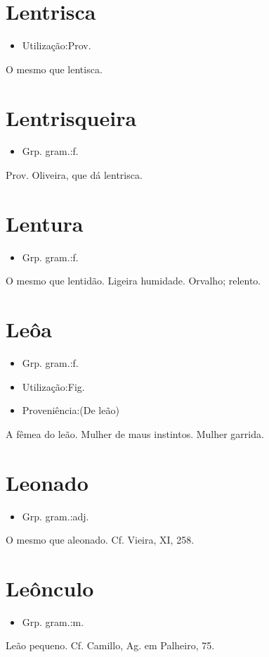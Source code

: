 \section{Lentrisca}
\begin{itemize}
\item {Utilização:Prov.}
\end{itemize}
O mesmo que \textunderscore lentisca\textunderscore .
\section{Lentrisqueira}
\begin{itemize}
\item {Grp. gram.:f.}
\end{itemize}
Prov. Oliveira, que dá lentrisca.
\section{Lentura}
\begin{itemize}
\item {Grp. gram.:f.}
\end{itemize}
O mesmo que \textunderscore lentidão\textunderscore .
Ligeira humidade.
Orvalho; relento.
\section{Leôa}
\begin{itemize}
\item {Grp. gram.:f.}
\end{itemize}
\begin{itemize}
\item {Utilização:Fig.}
\end{itemize}
\begin{itemize}
\item {Proveniência:(De \textunderscore leão\textunderscore )}
\end{itemize}
A fêmea do leão.
Mulher de maus instintos.
Mulher garrida.
\section{Leonado}
\begin{itemize}
\item {Grp. gram.:adj.}
\end{itemize}
O mesmo que \textunderscore aleonado\textunderscore . Cf. Vieira, XI, 258.
\section{Leônculo}
\begin{itemize}
\item {Grp. gram.:m.}
\end{itemize}
Leão pequeno. Cf. Camillo, \textunderscore Ag. em Palheiro\textunderscore , 75.
